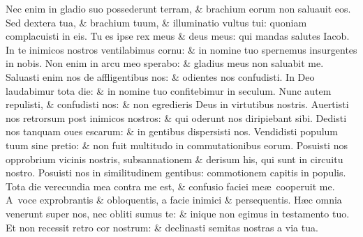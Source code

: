 \documentclass[a5paper,10pt]{book}
\def\ae{æ}
\begin{document}
\begin{multicols*}{2}
\newline \color{red} N\color{black}ec enim in gladio suo possederunt terram, \& brachium eorum non saluauit eos.
\newline \color{red} S\color{black}ed dextera tua, \& brachium tuum, \& illuminatio vultus tui: quoniam complacuisti in eis.
\newline \color{red} T\color{black}u es ipse rex meus \& deus meus: qui mandas salutes Iacob.
\newline \color{red} I\color{black}n te inimicos nostros ventilabimus cornu: \& in nomine tuo spernemus insurgentes in nobis.
\newline \color{red} N\color{black}on enim in arcu meo sperabo: \& gladius meus non saluabit me.
\newline \color{red} S\color{black}aluasti enim nos de affligentibus nos: \& odientes nos confudisti.
\newline \color{red} I\color{black}n Deo laudabimur tota die: \& in nomine tuo confitebimur in seculum.
\newline \color{red} N\color{black}unc autem repulisti, \& confudisti nos: \& non egredieris Deus in virtutibus nostris.
\newline \color{red} A\color{black}uertisti nos retrorsum post inimicos nostros: \& qui oderunt nos diripiebant sibi.
\newline \color{red} D\color{black}edisti nos tanquam oues escarum: \& in gentibus dispersisti nos.
\newline \color{red} V\color{black}endidisti populum tuum sine pretio: \& non fuit multitudo in commutationibus eorum.
\newline \color{red} P\color{black}osuisti nos opprobrium vicinis nostris, subsannationem \& derisum his, qui sunt in circuitu nostro.
\newline \color{red} P\color{black}osuisti nos in similitudinem gentibus: commotionem capitis in populis.
\newline \color{red} T\color{black}ota die verecundia mea contra me est, \& confusio faciei me\ae \ cooperuit me.
\newline \color{red} A\color{black}\ voce exprobrantis \& obloquentis, a facie inimici \& persequentis.
\newline \color{red} H\color{black}\ae c omnia venerunt super nos, nec obliti sumus te: \& inique non egimus in testamento tuo.
\newline \color{red} E\color{black}t non recessit retro cor nostrum: \& declinasti semitas nostras a via tua.

\end{multicols*}
\end{document}
